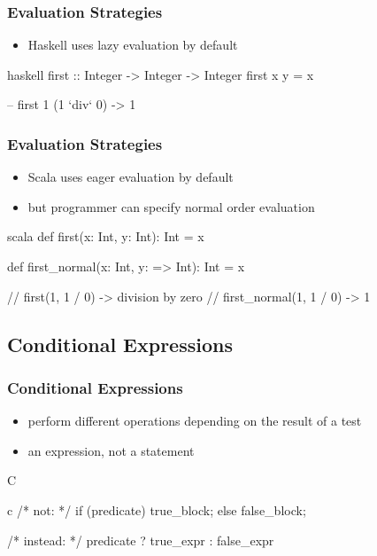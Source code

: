 \documentclass[dvipsnames]{beamer}
\theoremstyle{plain}
\begin{document}
\begin{frame}[fragile]
  \frametitle{Evaluation Strategies}

  \begin{itemize}
    \item Haskell uses lazy evaluation by default
  \end{itemize}

  \begin{example}[Haskell]
    \begin{pygments}{haskell}
first :: Integer -> Integer -> Integer
first x y = x

-- first 1 (1 `div` 0) -> 1
    \end{pygments}
  \end{example}
\end{frame}

\begin{frame}[fragile]
  \frametitle{Evaluation Strategies}

  \begin{itemize}
    \item Scala uses eager evaluation by default
    \item but programmer can specify normal order evaluation
  \end{itemize}

  \begin{example}[Scala]
    \begin{pygments}{scala}
def first(x: Int, y: Int): Int = x

def first_normal(x: Int, y: => Int): Int = x

// first(1, 1 / 0) -> division by zero
// first_normal(1, 1 / 0) -> 1
    \end{pygments}
  \end{example}
\end{frame}

\subsection{Conditional Expressions}

\begin{frame}[fragile]
  \frametitle{Conditional Expressions}

  \begin{itemize}
    \item perform different operations depending on the result of a test
    \item an expression, not a statement
  \end{itemize}

  \pause
  \begin{block}{C}
    \begin{pygments}{c}
/* not: */
if (predicate)
    true_block;
else
    false_block;

/* instead: */
predicate ? true_expr : false_expr
    \end{pygments}
  \end{block}
\end{frame}
\end{document}
